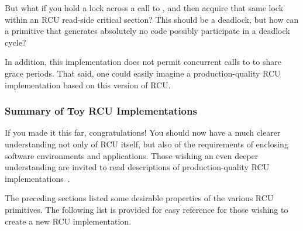\QuickQuiz{}
	But what if you hold a lock across a call to
	, and then acquire that same lock within
	an RCU read-side critical section?
	This should be a deadlock, but how can a primitive that
	generates absolutely no code possibly participate in a
	deadlock cycle?
 \QuickQuizEnd

In addition, this implementation does not permit concurrent calls
to  to share grace periods.
That said, one could easily imagine a production-quality RCU
implementation based on this version of RCU.

\subsubsection{Summary of Toy RCU Implementations}
\label{defer:Summary of Toy RCU Implementations}

If you made it this far, congratulations!
You should now have a much clearer understanding
not only of RCU itself, but also of the requirements of enclosing
software environments and applications.
Those wishing an even deeper understanding are invited to read
descriptions of production-quality RCU
implementations~\cite{MathieuDesnoyers2012URCU,PaulEMcKenney2007PreemptibleRCU,PaulEMcKenney2008HierarchicalRCU,PaulEMcKenney2009BloatwatchRCU}.

The preceding sections listed some desirable properties of the
various RCU primitives.
The following list is provided for easy reference for those wishing to
create a new RCU implementation.

